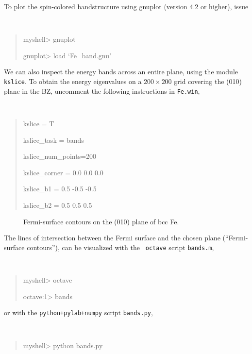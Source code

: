 \documentclass[a4paper,11pt,twoside]{article}
\begin{document}
To plot the spin-colored bandstructure using gnuplot (version 4.2 or
higher), issue
{\tt
\begin{quote}
myshell> gnuplot

gnuplot> load `Fe\_band.gnu'
\end{quote} }

We can also inspect the energy bands across an entire plane, using the
module {\tt kslice}.  To obtain the energy eigenvalues on a $200\times
200$ grid covering the (010) plane in the BZ, uncomment the following
instructions in {\tt Fe.win}, {\tt
\begin{quote}
kslice = T

kslice\_task = bands

kslice\_num\_points=200

kslice\_corner = 0.0  0.0  0.0

kslice\_b1 =     0.5 -0.5 -0.5

kslice\_b2 =     0.5  0.5  0.5
\end{quote} }

\begin{figure}[h]
\begin{center}
\caption{Fermi-surface contours on the (010) plane of bcc Fe.} 
\label{fig:fe-fermicontours}
\end{center}
\end{figure}

The lines of intersection between the Fermi surface and the chosen
plane (``Fermi-surface contours''), can be visualized with the {\tt
  octave} script {\tt bands.m}, {\tt
\begin{quote}
myshell> octave

octave:1> bands
\end{quote} }
\smallskip 

or with the {\tt python+pylab+numpy} script {\tt bands.py},
{\tt
\begin{quote}
myshell> python bands.py
\end{quote} }
\end{document}

